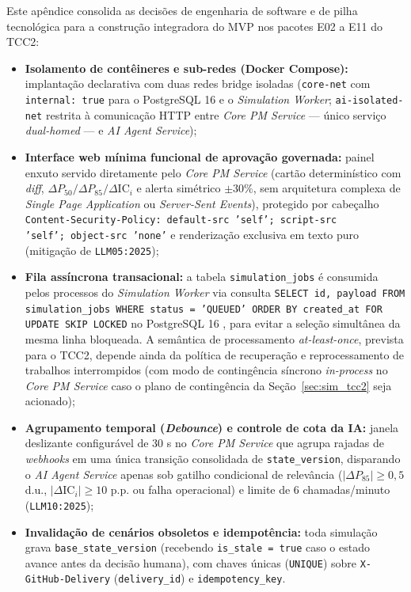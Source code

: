 \documentclass[12pt,openany,oneside,a4paper,english,brazilian,sumario=tradicional]{abntex2}
\newcommand{\IC}{\mathrm{IC}}
\begin{document}
\begin{apendicesenv}
Este apêndice consolida as decisões de engenharia de software e de pilha tecnológica para a construção integradora do MVP nos pacotes E02 a E11 do TCC2:
\begin{itemize}
  \item \textbf{Isolamento de contêineres e sub-redes (Docker Compose):} implantação declarativa \cite{merkel2014} com duas redes bridge isoladas (\texttt{core-net} com \texttt{internal: true} para o PostgreSQL 16 e o \textit{Simulation Worker}; \texttt{ai-isolated-net} restrita à comunicação HTTP entre \textit{Core PM Service} --- único serviço \textit{dual-homed} --- e \textit{AI Agent Service});
  \item \textbf{Interface web mínima funcional de aprovação governada:} painel enxuto servido diretamente pelo \textit{Core PM Service} (cartão determinístico com \textit{diff}, $\Delta P_{50}/\Delta P_{85}/\Delta\IC_i$ e alerta simétrico $\pm 30\%$, sem arquitetura complexa de \textit{Single Page Application} ou \textit{Server-Sent Events}), protegido por cabeçalho \texttt{Content-Security-Policy:}\allowbreak\ \texttt{default-src 'self';}\allowbreak\ \texttt{script-src 'self';}\allowbreak\ \texttt{object-src 'none'} e renderização exclusiva em texto puro (mitigação de \texttt{LLM05:2025});
  \item \textbf{Fila assíncrona transacional:} a tabela \texttt{simulation\_\allowbreak jobs} é consumida pelos processos do \textit{Simulation Worker} via consulta \texttt{SELECT id, payload FROM simulation\_\allowbreak jobs WHERE status = 'QUEUED' ORDER BY created\_\allowbreak at FOR UPDATE SKIP LOCKED} no PostgreSQL 16 \cite{postgresql2024}, para evitar a seleção simultânea da mesma linha bloqueada. A semântica de processamento \textit{at-least-once}, prevista para o TCC2, depende ainda da política de recuperação e reprocessamento de trabalhos interrompidos (com modo de contingência síncrono \textit{in-process} no \textit{Core PM Service} caso o plano de contingência da Seção~\ref{sec:sim_tcc2} seja acionado);
  \item \textbf{Agrupamento temporal (\textit{Debounce}) e controle de cota da IA:} janela deslizante configurável de 30 s no \textit{Core PM Service} que agrupa rajadas de \textit{webhooks} em uma única transição consolidada de \texttt{state\_\allowbreak version}, disparando o \textit{AI Agent Service} apenas sob gatilho condicional de relevância ($|\Delta P_{85}| \ge 0{,}5$ d.u., $|\Delta\IC_i| \ge 10$ p.p. ou falha operacional) e limite de 6 chamadas/minuto (\texttt{LLM10:2025});
  \item \textbf{Invalidação de cenários obsoletos e idempotência:} toda simulação grava \texttt{base\_\allowbreak state\_\allowbreak version} (recebendo \texttt{is\_\allowbreak stale = true} caso o estado avance antes da decisão humana), com chaves únicas (\texttt{UNIQUE}) sobre \texttt{X-GitHub-Delivery} (\texttt{delivery\_\allowbreak id}) e \texttt{idempotency\_\allowbreak key}.
\end{itemize}


\end{apendicesenv}
\end{document}
